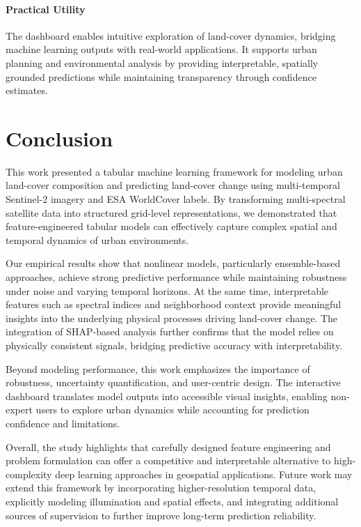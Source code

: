 \documentclass[11pt]{article}
\begin{document}
\paragraph{Practical Utility}
The dashboard enables intuitive exploration of land-cover dynamics, bridging machine learning outputs with real-world applications. It supports urban planning and environmental analysis by providing interpretable, spatially grounded predictions while maintaining transparency through confidence estimates.

\section{Conclusion}

This work presented a tabular machine learning framework for modeling urban land-cover composition and predicting land-cover change using multi-temporal Sentinel-2 imagery and ESA WorldCover labels. By transforming multi-spectral satellite data into structured grid-level representations, we demonstrated that feature-engineered tabular models can effectively capture complex spatial and temporal dynamics of urban environments.

Our empirical results show that nonlinear models, particularly ensemble-based approaches, achieve strong predictive performance while maintaining robustness under noise and varying temporal horizons. At the same time, interpretable features such as spectral indices and neighborhood context provide meaningful insights into the underlying physical processes driving land-cover change. The integration of SHAP-based analysis further confirms that the model relies on physically consistent signals, bridging predictive accuracy with interpretability.

Beyond modeling performance, this work emphasizes the importance of robustness, uncertainty quantification, and user-centric design. The interactive dashboard translates model outputs into accessible visual insights, enabling non-expert users to explore urban dynamics while accounting for prediction confidence and limitations.

Overall, the study highlights that carefully designed feature engineering and problem formulation can offer a competitive and interpretable alternative to high-complexity deep learning approaches in geospatial applications. Future work may extend this framework by incorporating higher-resolution temporal data, explicitly modeling illumination and spatial effects, and integrating additional sources of supervision to further improve long-term prediction reliability.
\end{document}
